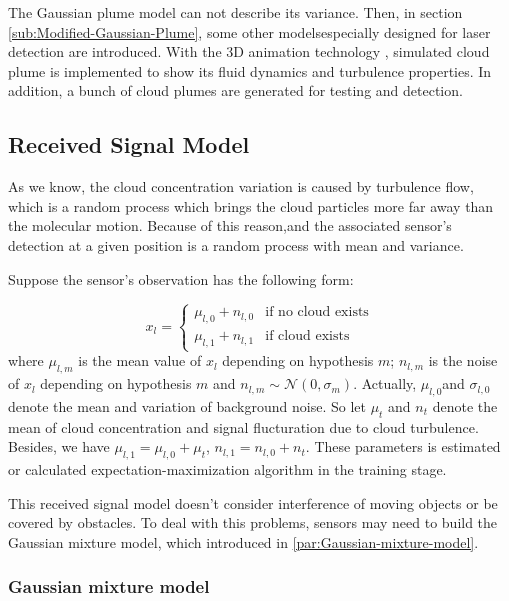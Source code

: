 The Gaussian plume model can not describe its variance. Then, in section
\ref{sub:Modified-Gaussian-Plume},  some other modelsespecially designed
for laser detection are introduced. With the  3D  animation technology
\cite{He2011}, simulated cloud plume is implemented to show its fluid
dynamics and  turbulence properties. In addition, a bunch of cloud
plumes are  generated   for testing and detection. 


\subsection{\label{sub:Received-Signal'-Model}Received Signal Model }

As we know, the cloud concentration variation is caused by turbulence
flow, which is a random process which brings the cloud particles more
far away than the molecular motion. Because of this reason,and the
associated sensor's detection at a given position is a random process
with mean and variance.

Suppose the sensor's observation has the following form:

\begin{equation}
x_{l}=\begin{cases}
\mu_{l,0}+n_{l,0} & \mbox{if no cloud exists}\\
\mu_{l,1}+n_{l,1} & \mbox{if cloud exists}
\end{cases}\label{eq:Model of Received signal}
\end{equation}
where $\mu_{l,m}$ is the mean value of $x_{l}$ depending on hypothesis
$m$; $n_{l,m}$ is the noise of $x_{l}$ depending on hypothesis
$m$ and $n_{l,m}\sim\mathcal{N}\left(0,\sigma_{m}\right)$. Actually,
$\mu_{l,0}$and $\sigma_{l,0}$ denote the mean and variation of background
noise. So let $\mu_{t}$ and $n_{t}$ denote the mean of cloud concentration
and signal flucturation due to cloud turbulence. Besides, we have
$\mu_{l,1}=\mu_{l,0}+\mu_{t}$, $n_{l,1}=n_{l,0}+n_{t}$. These parameters
is estimated or calculated expectation-maximization algorithm in the
training stage.

This received signal model doesn't consider interference of moving
objects or be covered by obstacles. To deal with this problems, sensors
may need to build the Gaussian mixture model, which introduced in
\ref{par:Gaussian-mixture-model}. 


\subsubsection{\label{par:Gaussian-mixture-model}Gaussian mixture model}

